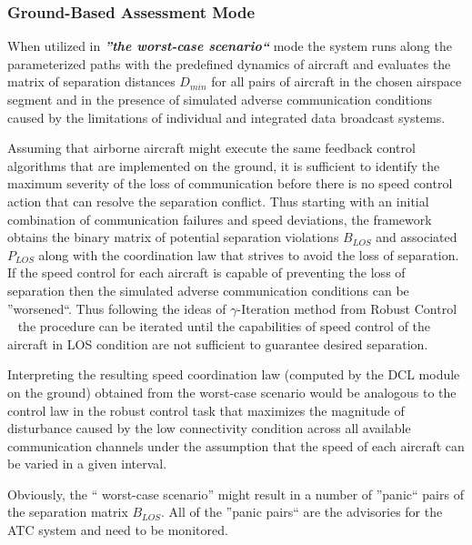 \documentclass[letter,onecolumn,12pt]{aiaa-tc}
\newcommand{\1}{1_n}
\begin{document}
\subsubsection{Ground-Based Assessment Mode}

When utilized in \textbf{\emph{''the worst-case scenario``}} mode the system runs along the  parameterized paths with the predefined dynamics of aircraft and evaluates the matrix of separation distances $D_{min}$ for all pairs of aircraft in the chosen airspace segment  and in the presence of simulated adverse communication conditions caused by the limitations of individual and integrated data broadcast systems.

Assuming that airborne aircraft might execute the same feedback control algorithms that are implemented on the ground, it is sufficient to identify the maximum severity of the loss of communication before there is no speed control action that can resolve the separation conflict. Thus starting with an initial combination of communication failures and speed deviations, the framework obtains the binary matrix of potential separation violations $B_{LOS}$ and associated $P_{LOS}$ along with the coordination law that strives to avoid the loss of separation. If  the speed control for each aircraft is capable of preventing the loss of separation then the simulated adverse communication conditions can be ''worsened``. Thus following the ideas of $\gamma$-Iteration method from Robust Control ~\cite{zhou1998essentials} the procedure can be iterated until the capabilities of speed control of the aircraft in LOS condition are not sufficient to guarantee desired separation.

Interpreting the resulting speed coordination law (computed by the DCL module on the ground) obtained from the worst-case
 scenario would be analogous to the control law in the robust control task that maximizes the magnitude of disturbance
 caused by the low connectivity condition across all available communication channels under the assumption that the speed
  of each aircraft can be varied in a given interval.

Obviously, the `` worst-case scenario'' might result in a number of ''panic`` pairs of the separation matrix $B_{LOS}$. All of the ''panic pairs`` are the advisories for the ATC system and need to be monitored.
\end{document}
